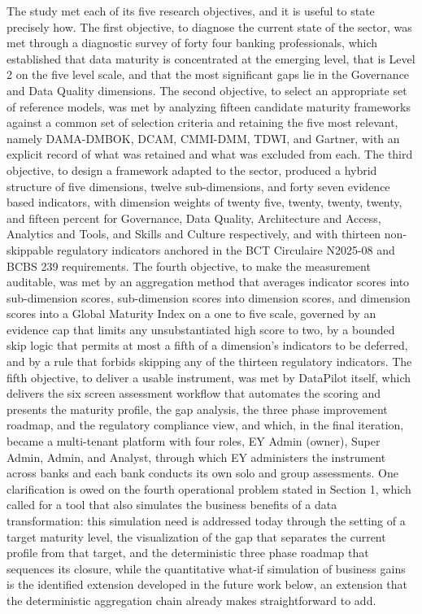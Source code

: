 The study met each of its five research objectives, and it is useful to state precisely how. The first objective, to diagnose the current state of the sector, was met through a diagnostic survey of forty four banking professionals, which established that data maturity is concentrated at the emerging level, that is Level 2 on the five level scale, and that the most significant gaps lie in the Governance and Data Quality dimensions. The second objective, to select an appropriate set of reference models, was met by analyzing fifteen candidate maturity frameworks against a common set of selection criteria and retaining the five most relevant, namely DAMA-DMBOK, DCAM, CMMI-DMM, TDWI, and Gartner, with an explicit record of what was retained and what was excluded from each. The third objective, to design a framework adapted to the sector, produced a hybrid structure of five dimensions, twelve sub-dimensions, and forty seven evidence based indicators, with dimension weights of twenty five, twenty, twenty, twenty, and fifteen percent for Governance, Data Quality, Architecture and Access, Analytics and Tools, and Skills and Culture respectively, and with thirteen non-skippable regulatory indicators anchored in the BCT Circulaire N\textdegree{}2025-08 and BCBS 239 requirements. The fourth objective, to make the measurement auditable, was met by an aggregation method that averages indicator scores into sub-dimension scores, sub-dimension scores into dimension scores, and dimension scores into a Global Maturity Index on a one to five scale, governed by an evidence cap that limits any unsubstantiated high score to two, by a bounded skip logic that permits at most a fifth of a dimension's indicators to be deferred, and by a rule that forbids skipping any of the thirteen regulatory indicators. The fifth objective, to deliver a usable instrument, was met by DataPilot itself, which delivers the six screen assessment workflow that automates the scoring and presents the maturity profile, the gap analysis, the three phase improvement roadmap, and the regulatory compliance view, and which, in the final iteration, became a multi-tenant platform with four roles, EY Admin (owner), Super Admin, Admin, and Analyst, through which EY administers the instrument across banks and each bank conducts its own solo and group assessments. One clarification is owed on the fourth operational problem stated in Section 1, which called for a tool that also simulates the business benefits of a data transformation: this simulation need is addressed today through the setting of a target maturity level, the visualization of the gap that separates the current profile from that target, and the deterministic three phase roadmap that sequences its closure, while the quantitative what-if simulation of business gains is the identified extension developed in the future work below, an extension that the deterministic aggregation chain already makes straightforward to add.

